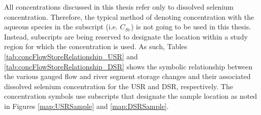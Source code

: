 All concentrations discussed in this thesis refer only to dissolved selenium concentration.  Therefore, the typical method of denoting concentration with the aqueous species in the subscript (i.e. $ C_{Se} $) is not going to be used in this thesis.  Instead, subscripts are being reserved to designate the location within a study region for which the concentration is used.  As such, Tables \ref{tab:concFlowStoreRelationship_USR} and \ref{tab:concFlowStoreRelationship_DSR} shows the symbolic relationship between the various gauged flow and  river segment storage changes and their associated dissolved selenium concentration for the USR and DSR, respectively.  The concentration symbols use subscripts that designate the sample location as noted in Figures \ref{map:USRSample} and \ref{map:DSRSample}.

\setcounter{table}{0}
\subtabletop
